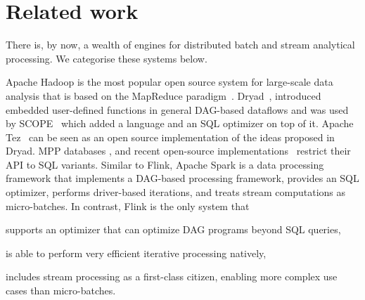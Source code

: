 \vspace{-4mm}
\section{Related work}
\vspace{-2mm}
\label{sec:related}
There is, by now, a wealth of engines for distributed batch and stream analytical processing. We categorise these systems below. 

 Apache Hadoop is the most popular open source system for large-scale data analysis that is based on the MapReduce paradigm~\cite{DBLP:journals/cacm/DeanG08}. Dryad~\cite{isard2007dryad}, introduced embedded user-defined functions in general DAG-based dataflows and was used by SCOPE~\cite{scopeOptimizer} which added a language and an SQL optimizer on top of it. Apache Tez~\cite{saha2015apache} can be seen as an open source implementation of the ideas proposed in Dryad. MPP databases \cite{dewitt1990gamma}, and recent open-source implementations~\cite{CUSTOM:web/Drill,kornacker2015impala} restrict their API to SQL variants. Similar to Flink, Apache Spark \cite{DBLP:conf/hotcloud/ZahariaCFSS10} is a data processing framework that implements a DAG-based processing framework, provides an SQL optimizer, performs driver-based iterations, and treats stream computations as micro-batches. In contrast, Flink is the only system that 
\begin{inparaenum}[i)]
  \item supports an optimizer that can optimize DAG programs beyond SQL queries,
  \item is able to perform very efficient iterative processing natively,
  \item includes stream processing as a first-class citizen, enabling more complex use cases than micro-batches.
\end{inparaenum}

